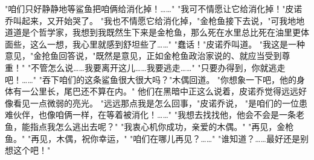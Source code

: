 \documentclass[12pt,UTF8]{ctexbook}
\begin{document}
"咱们只好静静地等鲨鱼把咱俩给消化掉！……"
"我可不情愿让它给消化掉！"皮诺乔叫起来，又开始哭了。
"我也不情愿它给消化掉，"金枪鱼接下去说，"可我地地道道是个哲学家，我想到我既然生下来是金枪鱼，那么死在水里总比死在油里更体面些，这么一想，我心里就感到舒坦些了……"
"蠢话！"皮诺乔叫道。
"我这是一种意见，"金抢鱼回答说，"既然是意见，正如金枪鱼政治家说的、就应当受到尊重！"
"不管怎么说……我要离开这儿……我要逃走……"
"只要办得到，你就逃走吧！……"
"吞下咱们的这条鲨鱼很大很大吗？"木偶回道。
"你想象一下吧，他的身体有一公里长，尾巴还不算在内。"
他们在黑暗中正这么说着，皮诺乔觉得远远好像看见一点微弱的亮光。
"远远那点我是怎么回事，"皮诺乔说，
"是咱们的一位患难伙伴，也像咱俩一样，在等着被消化！……"
"我想去找找他，他会不会是一条老鱼，能指点我怎么逃出去呢？"
"我衷心机你成功，亲爱的木偶。"
"再见，金枪鱼。"
"再见，木偶，祝你幸运，"
"咱们在哪儿再见？……"
"谁知道？……最好还是别想这个吧！"

\chapter{}
\end{document}
